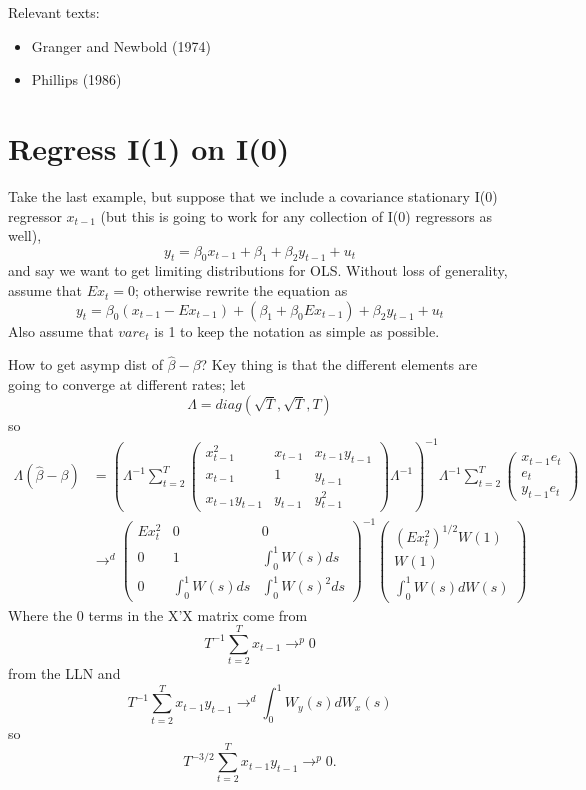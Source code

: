 Relevant texts:
\begin{itemize}
\item Granger and Newbold (1974)
\item Phillips (1986)
\end{itemize}

\section{Regress I(1) on I(0)}

Take the last example, but suppose that we include a covariance
stationary I(0) regressor $x_{t-1}$ (but this is going to work for any
collection of I(0) regressors as well),
\[y_t = β_0 x_{t-1} + β_1 + β_2 y_{t-1} + u_t\] and say we want to get
limiting distributions for OLS. Without loss of generality, assume that
$E x_t = 0$; otherwise rewrite the equation as
\[y_t = β_0 (x_{t-1} - E x_{t-1}) + (β_1 + β_0 E x_{t-1}) + β_2 y_{t-1} + u_t\]
Also assume that $var e_t$ is 1 to keep the notation as simple as
possible.

How to get asymp dist of $\hat β - β$? Key thing is that the different
elements are going to converge at different rates; let
\[Λ = diag(\sqrt{T}, \sqrt{T}, T)\] so
\begin{equation}
\begin{split}
  Λ (\hat β - β) &=  \left( Λ^{-1} \sum_{t=2}^T
    \begin{pmatrix}
      x_{t-1}^2       & x_{t-1}   & x_{t-1} y_{t-1} \\
      x_{t-1}         & 1         & y_{t-1} \\ 
      x_{t-1} y_{t-1} & y_{t-1}   & y_{t-1}^2
    \end{pmatrix} Λ^{-1} \right)^{-1}
  Λ^{-1} \sum_{t=2}^T 
  \begin{pmatrix}
    x_{t-1} e_t \\ e_t \\ y_{t-1} e_t 
  \end{pmatrix}\\
  & \to^d
  \begin{pmatrix}
    E x_t^2 & 0             & 0 \\
    0       & 1             & \int_0^1 W(s) ds \\
    0       & \int_0^1 W(s) ds & \int_0^1 W(s)^2 ds
  \end{pmatrix}^{-1}
  \begin{pmatrix} (E x_t^2)^{1/2} W(1) \\ W(1) \\ \int_0^1 W(s) dW(s) \end{pmatrix}
\end{split}
\end{equation}
Where the 0 terms in the X'X matrix come from
\[T^{-1} \sum_{t=2}^T x_{t-1} →^p 0\] from the LLN and
\[T^{-1} \sum_{t=2}^T x_{t-1} y_{t-1} →^d \int_0^1 W_y(s) dW_x(s)\] so
\[T^{-3/2} \sum_{t=2}^T x_{t-1} y_{t-1} →^p 0.\]

